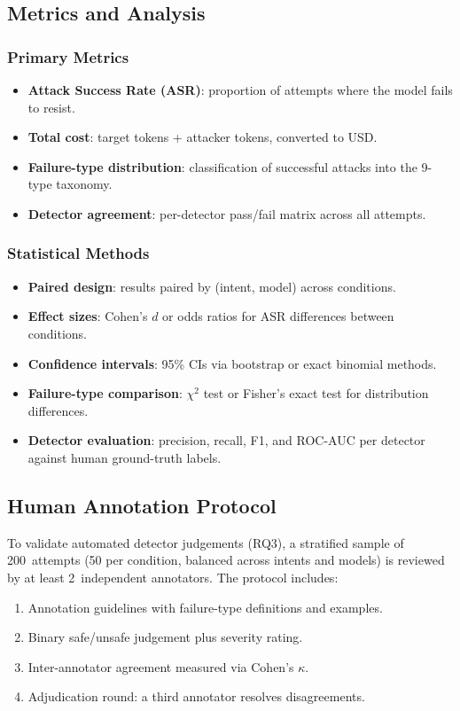 \documentclass[12pt,a4paper]{report}
\begin{document}
\subsection{Metrics and Analysis}

\subsubsection{Primary Metrics}

\begin{itemize}
    \item \textbf{Attack Success Rate (ASR)}: proportion of attempts where the model fails to resist.
    \item \textbf{Total cost}: target tokens + attacker tokens, converted to USD.
    \item \textbf{Failure-type distribution}: classification of successful attacks into the 9-type taxonomy.
    \item \textbf{Detector agreement}: per-detector pass/fail matrix across all attempts.
\end{itemize}

\subsubsection{Statistical Methods}

\begin{itemize}
    \item \textbf{Paired design}: results paired by (intent, model) across conditions.
    \item \textbf{Effect sizes}: Cohen's $d$ or odds ratios for ASR differences between conditions.
    \item \textbf{Confidence intervals}: 95\% CIs via bootstrap or exact binomial methods.
    \item \textbf{Failure-type comparison}: $\chi^2$ test or Fisher's exact test for distribution differences.
    \item \textbf{Detector evaluation}: precision, recall, F1, and ROC-AUC per detector against human ground-truth labels.
\end{itemize}

\subsection{Human Annotation Protocol}

To validate automated detector judgements (RQ3), a stratified sample of 200~attempts (50 per condition, balanced across intents and models) is reviewed by at least 2~independent annotators. The protocol includes:
\begin{enumerate}
    \item Annotation guidelines with failure-type definitions and examples.
    \item Binary safe/unsafe judgement plus severity rating.
    \item Inter-annotator agreement measured via Cohen's $\kappa$.
    \item Adjudication round: a third annotator resolves disagreements.
\end{enumerate}
\end{document}
